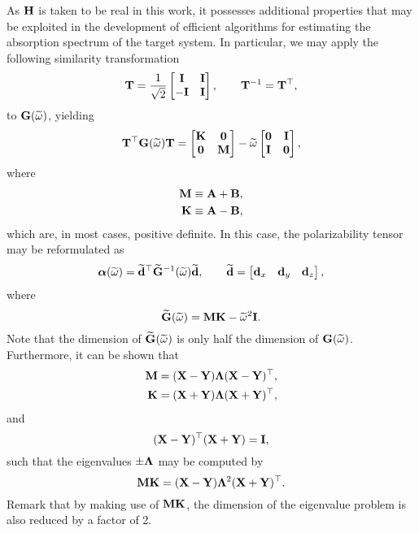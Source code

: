 As $\mathbf{H}$ is taken to be real in this work, it possesses additional properties that may be exploited in the development of efficient algorithms for estimating the absorption spectrum of the target system. In particular, we may apply the following similarity transformation
\begin{equation}
  \bT = \frac{1}{\sqrt{2}} \begin{bmatrix*}
     \bI & \bI \\
    -\bI & \bI
  \end{bmatrix*}, \qquad \bT\inv = \bT\T,
\label{eq:defT}
\end{equation}
to $\mathbf{G}(\widetilde{\omega})$, yielding
\begin{equation}
  \mathbf{T}^\top \mathbf{G}(\widetilde{\omega}) \mathbf{T} = \begin{bmatrix}
    \mathbf{K} & \boldsymbol{0} \\
    \boldsymbol{0} & \mathbf{M}
  \end{bmatrix} - \widetilde{\omega} \begin{bmatrix}
    \boldsymbol{0} & \mathbf{I} \\
    \mathbf{I} & \boldsymbol{0}
  \end{bmatrix},
  \label{eq:}
\end{equation}
where
\begin{align}
  \mathbf{M} &\equiv \mathbf{A} + \mathbf{B}, \label{eq:defM} \\
  \mathbf{K} &\equiv \mathbf{A} - \mathbf{B}, \label{eq:defK}
\end{align}
which are, in most cases, positive definite. In this case, the polarizability tensor may be reformulated as
\begin{equation}
  \boldsymbol{\alpha}(\widetilde{\omega}) = \widetilde{\mathbf{d}}^\top \widetilde{\mathbf{G}}^{-1}(\widetilde{\omega}) \widetilde{\mathbf{d}}, \qquad \widetilde{\mathbf{d}} = \begin{bmatrix}
    \mathbf{d}_x & \mathbf{d}_y & \mathbf{d}_z
  \end{bmatrix},
  \label{eq:polar-tensor-MK}
\end{equation}
where
\begin{equation}
  \widetilde{\mathbf{G}}(\widetilde{\omega}) = \mathbf{M}\mathbf{K} - \widetilde{\omega}^2\mathbf{I}.
  \label{eq:defGt}
\end{equation}
Note that the dimension of $\widetilde{\mathbf{G}}(\widetilde{\omega})$ is only half the dimension of $\mathbf{G}(\widetilde{\omega})$. Furthermore, it can be shown that
\begin{align}
 \mathbf{M} &= (\mathbf{X} - \mathbf{Y}) \mathbf{\Lambda} (\mathbf{X} - \mathbf{Y})^\top, \\
 \mathbf{K} &= (\mathbf{X} + \mathbf{Y}) \mathbf{\Lambda} (\mathbf{X} + \mathbf{Y})^\top,
\end{align}
and
\begin{equation}
  (\mathbf{X} - \mathbf{Y})^\top (\mathbf{X} + \mathbf{Y}) = \mathbf{I},
\end{equation}
such that the eigenvalues $\pm\mathbf{\Lambda}$ may be computed by
\begin{equation}
  \mathbf{M}\mathbf{K} = (\mathbf{X} - \mathbf{Y}) \mathbf{\Lambda}^2 (\mathbf{X} + \mathbf{Y})^\top.
\end{equation}
Remark that by making use of $\mathbf{M}\mathbf{K}$, the dimension of the eigenvalue problem is also reduced by a factor of 2.\cite{Haser93_1262,Frisch98_8218}


